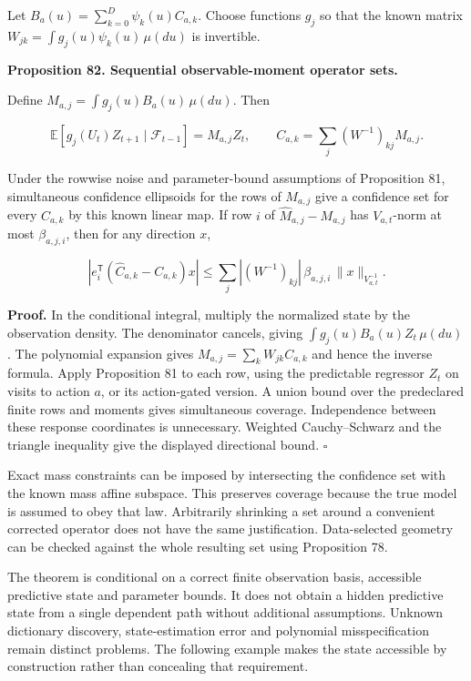\documentclass[11pt,letterpaper]{article}
\begin{document}
Let \(B_a(u)=\sum_{k=0}^{D}\psi_k(u)C_{a,k}\). Choose functions \(g_j\)
so that the known matrix \(W_{jk}=\int g_j(u)\psi_k(u)\,\mu(du)\) is
invertible.

\textbf{Proposition 82. Sequential observable-moment operator sets.}

Define \(M_{a,j}=\int g_j(u)B_a(u)\,\mu(du)\). Then

\[
\boxed{
\mathbb E[g_j(U_t)Z_{t+1}\mid\mathcal F_{t-1}]
=M_{a,j}Z_t,
\qquad
C_{a,k}=\sum_j(W^{-1})_{kj}M_{a,j}.
}
\]

Under the rowwise noise and parameter-bound assumptions of Proposition
81, simultaneous confidence ellipsoids for the rows of \(M_{a,j}\) give
a confidence set for every \(C_{a,k}\) by this known linear map. If row
\(i\) of \(\widehat M_{a,j}-M_{a,j}\) has \(V_{a,t}\)-norm at most
\(\beta_{a,j,i}\), then for any direction \(x\),

\[
\left|e_i^{\mathsf T}(\widehat C_{a,k}-C_{a,k})x\right|
\leq
\sum_j |(W^{-1})_{kj}|\,
\beta_{a,j,i}\,\|x\|_{V_{a,t}^{-1}}.
\]

\textbf{Proof.} In the conditional integral, multiply the normalized
state by the observation density. The denominator cancels, giving
\(\int g_j(u)B_a(u)Z_t\,\mu(du)\). The polynomial expansion gives
\(M_{a,j}=\sum_kW_{jk}C_{a,k}\) and hence the inverse formula. Apply
Proposition 81 to each row, using the predictable regressor \(Z_t\) on
visits to action \(a\), or its action-gated version. A union bound over
the predeclared finite rows and moments gives simultaneous coverage.
Independence between these response coordinates is unnecessary. Weighted
Cauchy--Schwarz and the triangle inequality give the displayed
directional bound. \(\square\)

Exact mass constraints can be imposed by intersecting the confidence set
with the known mass affine subspace. This preserves coverage because the
true model is assumed to obey that law. Arbitrarily shrinking a set
around a convenient corrected operator does not have the same
justification. Data-selected geometry can be checked against the whole
resulting set using Proposition 78.

The theorem is conditional on a correct finite observation basis,
accessible predictive state and parameter bounds. It does not obtain a
hidden predictive state from a single dependent path without additional
assumptions. Unknown dictionary discovery, state-estimation error and
polynomial misspecification remain distinct problems. The following
example makes the state accessible by construction rather than
concealing that requirement.
\end{document}
